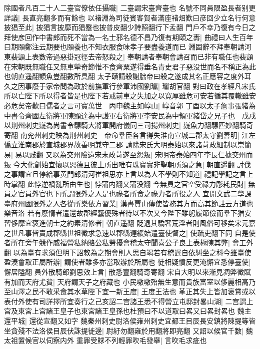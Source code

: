 除國者凡百二十人二臺官僚依任攝職|{
	二臺謂宋臺齊臺也}
名號不同員限盈長者别更詳議|{
	長直亮翻多而有餘也}
以褚淵為司徒賓客賀者滿座禇炤歎曰彦回少立名行何意披猖至此|{
	披猖言披靡而猖蹷也披普皮翻少詩照翻行下孟翻}
門戶不幸乃復有今日之拜使彦回作中書郎而死不當為一名士邪名德不昌乃復有期頤之夀|{
	曲禮曰人生百年曰期頤鄭注云期要也頤養也不知衣服食味孝子要盡養道而已}
淵固辭不拜奉朝請河東裴顗上表數帝過惡掛冠徑去帝怒殺之|{
	奉朝請者奉朝會請召而已非有職任也裴顗在宋朝既無職任又無車犖奇節惟不食齊粟遂得垂名青史君子惡没世而名不稱正為此也朝直遥翻顗魚豈翻數所具翻}
太子賾請殺謝朏帝曰殺之遂成其名正應容之度外耳久之因事廢于家帝問為政於前撫軍行參軍沛國劉瓛|{
	瓛胡官翻}
對曰政在孝經凡宋氏所以亡陛下所以得者皆是也陛下若戒前車之失加之以寛厚雖危可安若循其覆轍雖安必危矣帝歎曰儒者之言可寶萬世　丙申魏主如崞山|{
	崞音郭}
丁酉以太子詹事張緒為中書令齊國左衛將軍陳顯達為中護軍右衛將軍李安民為中領軍緒岱之兄子也　戊戌以荆州刺史嶷為尚書令驃騎大將軍開府儀同三司揚州刺史|{
	嶷魚力翻驃匹妙翻騎奇寄翻}
南兖州刺史映為荆州刺史　帝命羣臣各言得失淮南宣城二郡太守劉善明|{
	江左僑立淮南郡於宣城郡界故善明兼守二郡}
請除宋氏大明泰始以來諸苛政細制以崇簡易|{
	易以䜴翻}
又以為交州險遠宋末政苛遂至怨叛|{
	宋明帝泰始四年李長仁據交州而叛}
今大化創始宜懷以恩德且彼土所出唯有珠寶實非聖朝所須之急|{
	朝直遥翻}
討伐之事謂宜且停給事黄門郎清河崔祖思亦上言以為人不學則不知道|{
	禮記學記之言上時掌翻}
此悖逆禍亂所由生也|{
	悖蒲内翻又蒲没翻}
今無員之官空受祿力彫耗民財|{
	無員之官員外官也下所謂限外之人是也祿者所食之祿力者所役之人}
宜開文武二學課臺府州國限外之人各從所樂依方習業|{
	漢書賈山傳使皆務其方而高其節註云方道也樂音洛}
若有廢惰者遣還故郡經藝優殊者待以不次又今陛下雖躬履節儉而羣下猶安習侈靡宜褒進朝士之約素清修者|{
	朝直遥翻}
貶退其驕奢荒淫者則風俗可移矣宋元嘉之世凡事皆責成郡縣世祖徵求急速以郡縣遟緩始遣臺使督之|{
	使疏吏翻下同}
自是使者所在旁午競作威福營私納賂公私勞擾會稽太守聞喜公子良上表極陳其弊|{
	會工外翻}
以為臺有求須但明下詔敕為之期會則人思自竭若有稽遟自依糾坐之科今雖臺使盈湊會取正屬所辦|{
	謂使者雖多亦當取辦於所屬也}
徒相疑憤反更淹懈宜悉停臺使|{
	懈居隘翻}
員外散騎郎劉思效上言|{
	散悉亶翻騎奇寄翻}
宋自大明以來漸見凋弊徵賦有加而天府尤貧|{
	天府謂天子之府藏也}
小民嗷嗷殆無生意而貴族富室以侈麗相高乃至山澤之民不敢采食其水草陛下宜一新王度|{
	王度王法也}
革正其失上皆加褒賞或以表付外使有司詳擇所宜奏行之己亥詔二宫諸王悉不得營立屯邸封畧山湖|{
	二宫謂上宫及東宮上宫諸王皇子也東宮諸王皇孫也杜預曰不以道取曰畧又曰畧封畧也}
魏主還平城|{
	還從宣翻又如字}
魏秦州刺史尉洛侯雍州刺史宜都王目辰長安鎮將陳提等皆坐貪殘不法洛侯目辰伏誅提徙邊|{
	尉紆勿翻雍於用翻將即亮翻}
又詔以候官千數|{
	魏太祖置候官以伺察内外}
重罪受賕不列輕罪吹毛發舉|{
	言吹毛求疵也}
